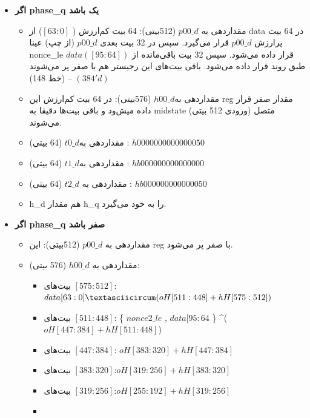 \begin{itemize}
	\item
	      \textbf{اگر phase\_q یک باشد}
	      \begin{itemize}
	      	\item
	      	      مقداردهی به $p00\_d$ (512بیتی): 64 بیت کم‌ارزش ( $[63:0]$) از data در 64 بیت پرارزش $p00\_d$ قرار می‌گیرد. سپس در 32 بیت بعدی $p00\_d$ (از چپ) عینا nonce\_le قرار داده می‌شود. سپس 32 بیت باقی‌مانده از $data ([95:64])$ طبق روند قرار داده می‌شود. باقی بیت‌های این رجیستر هم با صفر پر می‌شوند $(384'd)$ – (خط 148)
	      	\item
	      	      مقداردهی به$ h00\_d$ (576بیتی): در 64 بیت کم‌ارزش این reg مقدار صفر قرار داده میش‌ود و باقی بیت‌ها دقیقا به midstate (ورودی 512 بیتی) متصل می‌شوند.
	      	\item
	      	      مقداردهی به$ t0\_d$ (64 بیتی) : $h0000000000000050$
	      	\item
	      	      مقداردهی به$ t1\_d$ (64 بیتی) : $hb000000000000000$
	      	\item
	      	      مقداردهی به $t2\_d$ (64 بیتی) : $hb000000000000050$
	      	\item
	      	      h\_d هم مقدار h\_q را به خود می‌گیرد.
	      \end{itemize}
	\item
\textbf{	      اگر phase\_q صفر باشد
}	      \begin{itemize}
	      	\item
	      	      مقداردهی به $p00\_d$ (512بیتی): این reg با صفر پر می‌شود.
	      	\item
	      	      مقداردهی به $h00\_d$ (576 بیتی):
	      	      \begin{itemize}
	      	      	\item
	      	      	      بیت‌های $[575:512]$:	
	      	      	      	$data[63:0] \textasciicircum ( oH[511:448] + hH[575:512])$
	      	      	\item
	      	      	      بیت‌های $[511:448]$: 
	      	      	      	\{ $nonce2\_le$ , $data[95:64$ \} \textasciicircum ( $oH[447:384] + hH[511:448]$)
	      	      	\item
	      	      	      بیت‌های $[447:384]$:  $	oH[383:320] + hH[447:384]$
	      	      	\item
	      	      	      بیت‌های $[383:320]$:$	oH[319:256] + hH[383:320]$
	      	      	\item
	      	      	      بیت‌های $[319:256]$:$	oH[255:192] + hH[319:256]$
	      	      	\item

\end{itemize}
\end{itemize}
\end{itemize}
